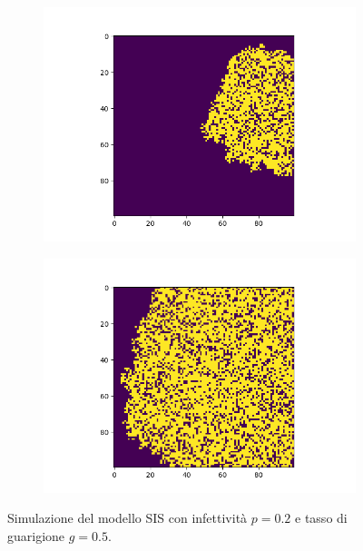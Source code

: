 \documentclass{article}
\begin{document}
    \begin{figure}[H]
        \centering
        \begin{subfigure}[b]{0.49\linewidth}
         \centering
         \includegraphics[width=\linewidth]{../images/sis_image1}
     \end{subfigure}
        \hfill
        \begin{subfigure}[b]{0.49\linewidth}
         \centering
         \includegraphics[width=\linewidth]{../images/sis_image2}
     \end{subfigure}
     \caption{Simulazione del modello SIS con infettività $p=0.2$ e tasso di guarigione $g=0.5$.}
     \label{fig:sis_image}
    \end{figure}
\end{document}
